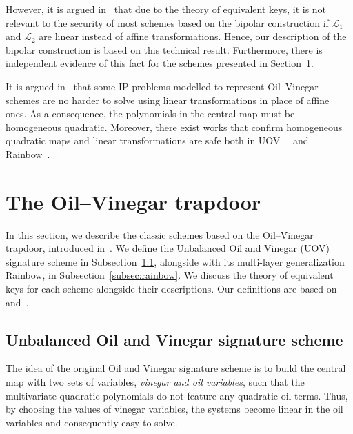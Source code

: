 \documentclass[english]{ufsc-thesis-rn46-2019/ufsc-thesis-rn46-2019}
\theoremstyle{definition}
\begin{document}
However, it is argued in~\cite[Remark~3.1]{Wolf:201104} that due to the theory
of equivalent keys, it is not relevant to the security of most schemes based on
the bipolar construction if $\mathcal{L}_{1}$ and $\mathcal{L}_{2}$ are linear
instead of affine transformations. Hence, our description of the bipolar
construction is based on this technical result. Furthermore, there is
independent evidence of this fact for the schemes presented in
Section~\ref{sec:ov}.

It is argued in~\cite[Lemmas~3.2,~3.10,~3.19]{Thomae:201306} that some IP
problems modelled to represent Oil--Vinegar schemes are no harder to solve
using linear transformations in place of affine ones. As a consequence, the
polynomials in the central map must be homogeneous quadratic. Moreover, there
exist works that confirm homogeneous quadratic maps and linear transformations
are safe both in
UOV~\cite[Sec.~5]{Kipnis:199808}~\cite[Sec.~3.1]{Braeken:200502} and
Rainbow~\cite[Sec.~3.1]{Ding:201901}.

\section{The Oil--Vinegar trapdoor}\label{sec:ov}

In this section, we describe the classic schemes based on the Oil--Vinegar
trapdoor, introduced in~\cite{Patarin:199709}. We define the Unbalanced Oil and
Vinegar (UOV) signature scheme in Subsection~\ref{subsec:uov}, alongside with
its multi-layer generalization Rainbow, in Subsection~\ref{subsec:rainbow}. We
discuss the theory of equivalent keys for each scheme alongside their
descriptions. Our definitions are based on~\cite[Chap.~3]{Ding:2006}
and~\cite[Chap.~3]{Petzoldt:201307}.

\subsection{Unbalanced Oil and Vinegar signature scheme}\label{subsec:uov}

The idea of the original Oil and Vinegar signature scheme is to build the
central map with two sets of variables, \emph{vinegar and oil variables}, such
that the multivariate quadratic polynomials do not feature any quadratic oil
terms. Thus, by choosing the values of vinegar variables, the systems become
linear in the oil variables and consequently easy to solve.
\end{document}
